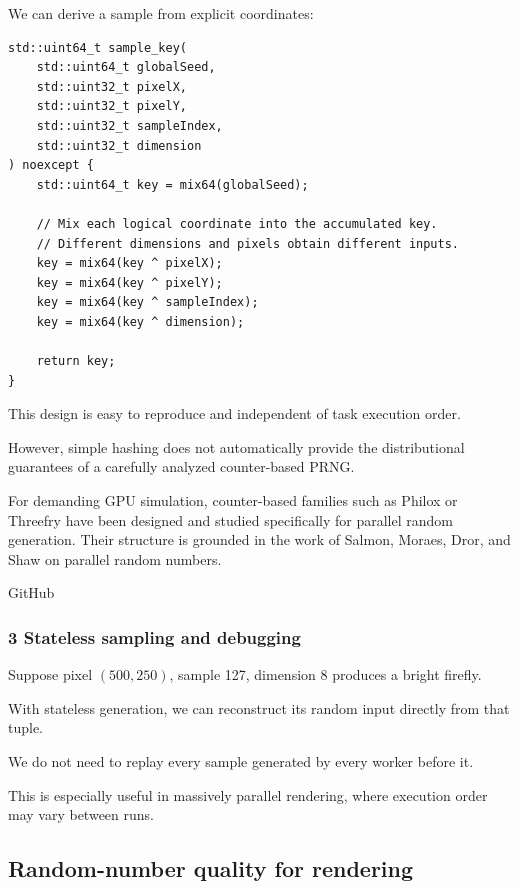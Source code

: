 We can derive a sample from explicit coordinates:

\begin{verbatim}
std::uint64_t sample_key(
    std::uint64_t globalSeed,
    std::uint32_t pixelX,
    std::uint32_t pixelY,
    std::uint32_t sampleIndex,
    std::uint32_t dimension
) noexcept {
    std::uint64_t key = mix64(globalSeed);

    // Mix each logical coordinate into the accumulated key.
    // Different dimensions and pixels obtain different inputs.
    key = mix64(key ^ pixelX);
    key = mix64(key ^ pixelY);
    key = mix64(key ^ sampleIndex);
    key = mix64(key ^ dimension);

    return key;
}
\end{verbatim}

This design is easy to reproduce and independent of task execution order.

However, simple hashing does not automatically provide the distributional guarantees of a carefully analyzed counter-based PRNG.

For demanding GPU simulation, counter-based families such as Philox or Threefry have been designed and studied specifically for parallel random generation. Their structure is grounded in the work of Salmon, Moraes, Dror, and Shaw on parallel random numbers.

GitHub

\subsubsection{3 Stateless sampling and debugging}\label{02-foundations-ii-ch029-stateless-sampling-and-debugging}

Suppose pixel \((500,250)\), sample 127, dimension 8 produces a bright firefly.

With stateless generation, we can reconstruct its random input directly from that tuple.

We do not need to replay every sample generated by every worker before it.

This is especially useful in massively parallel rendering, where execution order may vary between runs.

\subsection{Random-number quality for rendering}\label{02-foundations-ii-ch029-random-number-quality-for-rendering}


